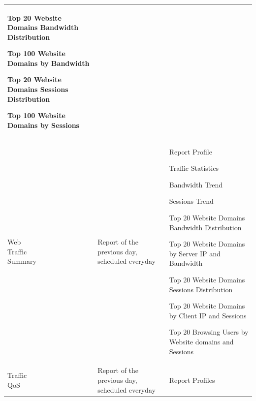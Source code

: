 \begin{longtable}{p{}|p{}|p{}}
                                                                                                    Top 20 Website Domains Bandwidth Distribution


                                                                                                    Top 100 Website Domains by Bandwidth


                                                                                                    Top 20 Website Domains Sessions Distribution


                                                                                                    Top 100 Website Domains by Sessions \\\hline

    \tabincell{l}{Web\\ Traffic\\ Summary} &	Report of the previous day, scheduled everyday &	Report Profile


                                                                                                    Traffic Statistics


                                                                                                    Bandwidth Trend


                                                                                                    Sessions Trend 


                                                                                                    Top 20 Website Domains Bandwidth Distribution


                                                                                                    Top 20 Website Domains by Server IP and Bandwidth


                                                                                                    Top 20 Website Domains Sessions Distribution


                                                                                                    Top 20 Website Domains by Client IP and Sessions


                                                                                                    Top 20 Browsing Users by Website domains and Sessions \\\hline
 
    \tabincell{l}{Traffic\\ QoS} &	Report of the previous day, scheduled everyday &	Report Profiles



\end{longtable}

